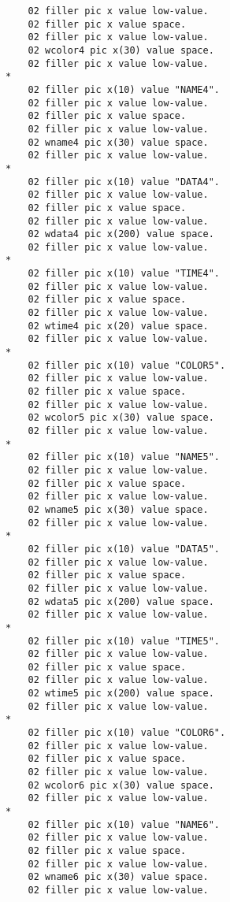 {{{\begin{verbatim}
          02 filler pic x value low-value.
          02 filler pic x value space.
          02 filler pic x value low-value.
          02 wcolor4 pic x(30) value space.
          02 filler pic x value low-value.
      *    
          02 filler pic x(10) value "NAME4".
          02 filler pic x value low-value.
          02 filler pic x value space.
          02 filler pic x value low-value.
          02 wname4 pic x(30) value space.
          02 filler pic x value low-value.
      *    
          02 filler pic x(10) value "DATA4".
          02 filler pic x value low-value.
          02 filler pic x value space.
          02 filler pic x value low-value.
          02 wdata4 pic x(200) value space.
          02 filler pic x value low-value.
      *    
          02 filler pic x(10) value "TIME4".
          02 filler pic x value low-value.
          02 filler pic x value space.
          02 filler pic x value low-value.
          02 wtime4 pic x(20) value space.
          02 filler pic x value low-value.
      *    
          02 filler pic x(10) value "COLOR5".
          02 filler pic x value low-value.
          02 filler pic x value space.
          02 filler pic x value low-value.
          02 wcolor5 pic x(30) value space.
          02 filler pic x value low-value.
      *    
          02 filler pic x(10) value "NAME5".
          02 filler pic x value low-value.
          02 filler pic x value space.
          02 filler pic x value low-value.
          02 wname5 pic x(30) value space.
          02 filler pic x value low-value.
      *    
          02 filler pic x(10) value "DATA5".
          02 filler pic x value low-value.
          02 filler pic x value space.
          02 filler pic x value low-value.
          02 wdata5 pic x(200) value space.
          02 filler pic x value low-value.
      *    
          02 filler pic x(10) value "TIME5".
          02 filler pic x value low-value.
          02 filler pic x value space.
          02 filler pic x value low-value.
          02 wtime5 pic x(200) value space.
          02 filler pic x value low-value.
      *    
          02 filler pic x(10) value "COLOR6".
          02 filler pic x value low-value.
          02 filler pic x value space.
          02 filler pic x value low-value.
          02 wcolor6 pic x(30) value space.
          02 filler pic x value low-value.
      *    
          02 filler pic x(10) value "NAME6".
          02 filler pic x value low-value.
          02 filler pic x value space.
          02 filler pic x value low-value.
          02 wname6 pic x(30) value space.
          02 filler pic x value low-value.

\end{verbatim}}}}
